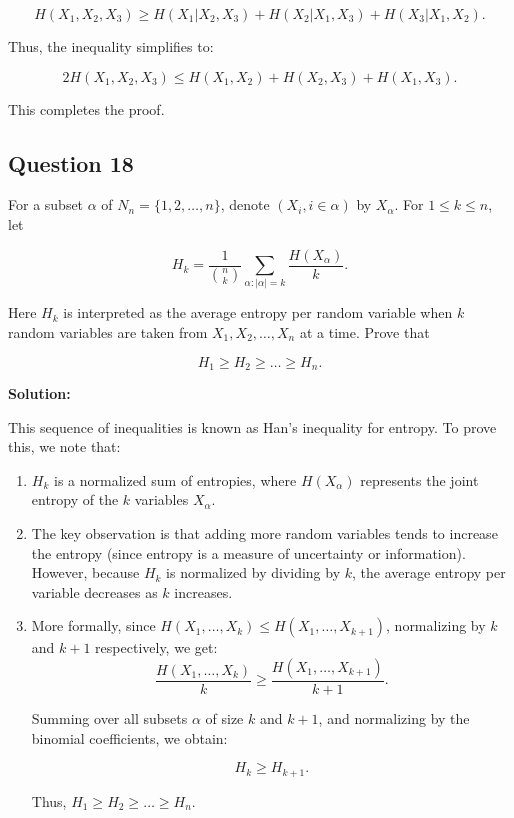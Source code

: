 \documentclass[a4paper,10pt]{article}
\begin{document}
$$
H(X_1, X_2, X_3) \geq H(X_1 | X_2, X_3) + H(X_2 | X_1, X_3) + H(X_3 | X_1, X_2).
$$

Thus, the inequality simplifies to:

$$
2H(X_1, X_2, X_3) \leq H(X_1, X_2) + H(X_2, X_3) + H(X_1, X_3).
$$

This completes the proof.

\subsection*{Question 18}

For a subset $ \alpha $ of $ N_n = \{1, 2, \dots, n\} $, denote $ (X_i, i \in \alpha) $ by $ X_\alpha $. For $ 1 \leq k \leq n $, let

$$
H_k = \frac{1}{{n \choose k}} \sum_{\alpha:|\alpha|=k} \frac{H(X_\alpha)}{k}.
$$

Here $ H_k $ is interpreted as the average entropy per random variable when $ k $ random variables are taken from $ X_1, X_2, \dots, X_n $ at a time. Prove that

$$
H_1 \geq H_2 \geq \dots \geq H_n.
$$

\textbf{Solution:}

This sequence of inequalities is known as Han's inequality for entropy. To prove this, we note that:

\begin{enumerate}
    \item $ H_k $ is a normalized sum of entropies, where $ H(X_\alpha) $ represents the joint entropy of the $ k $ variables $ X_\alpha $.
    \item The key observation is that adding more random variables tends to increase the entropy (since entropy is a measure of uncertainty or information). However, because $ H_k $ is normalized by dividing by $ k $, the average entropy per variable decreases as $ k $ increases.
    \item More formally, since $ H(X_1, \dots, X_k) \leq H(X_1, \dots, X_{k+1}) $, normalizing by $ k $ and $ k+1 $ respectively, we get:
    $$
    \frac{H(X_1, \dots, X_k)}{k} \geq \frac{H(X_1, \dots, X_{k+1})}{k+1}.
    $$

    Summing over all subsets $ \alpha $ of size $ k $ and $ k+1 $, and normalizing by the binomial coefficients, we obtain:

    $$
    H_k \geq H_{k+1}.
    $$

    Thus, $ H_1 \geq H_2 \geq \dots \geq H_n $.
\end{enumerate}
\end{document}
